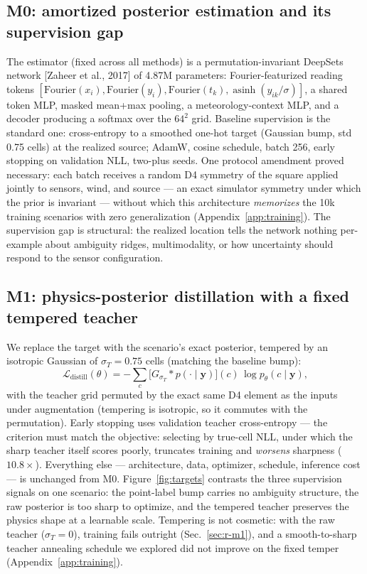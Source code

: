 \documentclass{article}
\begin{document}
\subsection{M0: amortized posterior estimation and its supervision gap}
\label{sec:m0}

The estimator (fixed across all methods) is a permutation-invariant DeepSets network
[Zaheer et al., 2017] of 4.87M parameters: Fourier-featurized reading tokens
$[\mathrm{Fourier}(x_i), \mathrm{Fourier}(y_i), \mathrm{Fourier}(t_k),
\operatorname{asinh}(y_{ik}/\sigma)]$, a shared token MLP, masked mean+max pooling, a
meteorology-context MLP, and a decoder producing a softmax over the $64^2$ grid. Baseline
supervision is the standard one: cross-entropy to a smoothed one-hot target (Gaussian
bump, std 0.75 cells) at the realized source; AdamW, cosine schedule, batch 256, early
stopping on validation NLL, two-plus seeds. One protocol amendment proved necessary: each
batch receives a random D4 symmetry of the square applied jointly to sensors, wind, and
source --- an exact simulator symmetry under which the prior is invariant --- without which
this architecture \emph{memorizes} the 10k training scenarios with zero generalization
(Appendix~\ref{app:training}). The supervision gap is structural: the realized location
tells the network nothing per-example about ambiguity ridges, multimodality, or how
uncertainty should respond to the sensor configuration.

\subsection{M1: physics-posterior distillation with a fixed tempered teacher}
\label{sec:m1}

We replace the target with the scenario's exact posterior, tempered by an isotropic
Gaussian of $\sigma_T = 0.75$ cells (matching the baseline bump):
\begin{equation}
\mathcal{L}_{\mathrm{distill}}(\theta)
= - \sum_{c} \big[ G_{\sigma_T} * p(\cdot \mid \boldsymbol{y}) \big](c)\,
  \log p_\theta(c \mid \boldsymbol{y}),
\label{eq:distill}
\end{equation}
with the teacher grid permuted by the exact same D4 element as the inputs under
augmentation (tempering is isotropic, so it commutes with the permutation). Early
stopping uses validation teacher cross-entropy --- the criterion must match the
objective: selecting by true-cell NLL, under which the sharp teacher itself scores
poorly, truncates training and \emph{worsens} sharpness ($10.8\times$). Everything else
--- architecture, data, optimizer, schedule, inference cost --- is unchanged from M0.
Figure~\ref{fig:targets} contrasts the three supervision signals on one scenario:
the point-label bump carries no ambiguity structure, the raw posterior is too sharp to
optimize, and the tempered teacher preserves the physics shape at a learnable scale.
Tempering is not cosmetic: with the raw teacher ($\sigma_T = 0$), training fails
outright (Sec.~\ref{sec:r-m1}), and a smooth-to-sharp teacher annealing schedule we
explored did not improve on the fixed temper (Appendix~\ref{app:training}).
\end{document}
